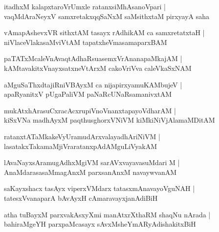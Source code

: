 \documentclass[twoside,12pt,openright]{book}
\newcounter{shloka}[chapter]
\begin{document}
\begin{shloka}%
itadhxM kalapxtaroVrUmxle ratanxsiMhAsanoVpari |\\
vaqMdAraNeyxV samxretakxqqSaNxM saMsithxtaM pirxyayA saha 
\end{shloka}

\begin{shloka}%
vAmapAshevxVR sithxtAM tasayx rAdhikAM ca samxretatxtaH |\\
niVlaceVlakasaMviVtAM tapatxheVmasamaparxBAM 
\end{shloka}

\begin{shloka}%
paTATxMcaleVnAvaqtAdhaRsuasemxVrAnanapaMkajAM |\\
kAMtavakitxVnayxsatxneVtArxM cakoVriVva caleVkaSxNAM 
\end{shloka}

\begin{shloka}%
aMguSaThxdtajiRniVBAyxM ca nijapirxyamuKAMbujeV |\\
apaRyanitxV pUgaPaliVM paNaRcUNaRsamanivxtAM 
\end{shloka}

\begin{shloka}%
mukAtxhArasuCxracAcxrupiVnoVnanxtapayoVdharAM |\\
kiSxVNa madhAyxM paqthusghorxVNiVM kiMkiNiVjAlamaMDitAM
\end{shloka}

\begin{shloka}%
ratanxtATaMkakeVyUramudArxvalayadhAriNiVM |\\
lasatakxTakamaMjiVraratanxpAdAMguLiVyakAM 
\end{shloka}

\begin{shloka}%
lAvaNayxsAramugAdhxMgiVM sarAVxvayavasuMdari M |\\
AnaMdarasasaMmagAnxM parxsanAnxM navaywvanAM 
\end{shloka}

\begin{shloka}%
saKayxshacx tasAyx viperxVMdarx tatasxmAnavayoVguNAH |\\
tatesxVvanaparA bAvAyxH cAmaravayxjanAdiBiH 
\end{shloka}

\begin{shloka}%
atha tuBayxM parxvakAsxyXmi manAtxrXthaRM shaqNu nArada |\\
bahiraMgeYH parxpaMcasayx sAvxMsheYmARyAdishakitxBiH
\end{shloka}
\end{document}
